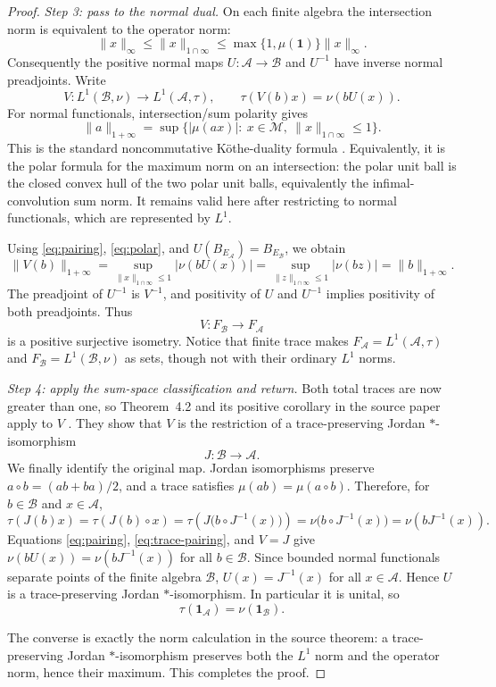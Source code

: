 \documentclass[11pt]{article}
\newcommand{\A}{\mathcal A}
\newcommand{\B}{\mathcal B}
\newcommand{\one}{\mathbf 1}
\newcommand{\Ncap}[1]{\lVert #1\rVert_{1\cap\infty}}
\begin{document}
\begin{proof}
\medskip
\noindent\emph{Step 3: pass to the normal dual.}
On each finite algebra the intersection norm is equivalent to the operator
norm:
\[
 \|x\|_\infty\leq\Ncap{x}\leq
 \max\{1,\mu(\one)\}\|x\|_\infty.
\]
Consequently the positive normal maps $U:\A\to\B$ and $U^{-1}$ have inverse
normal preadjoints.  Write
\begin{equation}\label{eq:pairing}
 V:L^1(\B,\nu)\longrightarrow L^1(\A,\tau),
 \qquad \tau(V(b)x)=\nu(bU(x)).
\end{equation}
For normal functionals, intersection/sum polarity gives
\begin{equation}\label{eq:polar}
 \|a\|_{1+\infty}
 =\sup\bigl\{|\mu(ax)|:\ x\in\mathcal M,
                   \ \|x\|_{1\cap\infty}\leq1\bigr\}.
\end{equation}
This is the standard noncommutative K\"othe-duality formula
\cite{DoddsDoddsDePagter}.  Equivalently, it is the polar formula for the
maximum norm on an intersection:
the polar unit ball is the closed convex hull of the two polar unit balls,
equivalently the infimal-convolution sum norm.  It remains valid here after
restricting to normal functionals, which are represented by $L^1$.

Using \eqref{eq:pairing}, \eqref{eq:polar}, and
$U(B_{E_\A})=B_{E_\B}$, we obtain
\[
 \|V(b)\|_{1+\infty}
 =\sup_{\Ncap{x}\leq1}|\nu(bU(x))|
 =\sup_{\Ncap{z}\leq1}|\nu(bz)|
 =\|b\|_{1+\infty}.
\]
The preadjoint of $U^{-1}$ is $V^{-1}$, and positivity of $U$ and $U^{-1}$
implies positivity of both preadjoints.  Thus
\[
 V:F_\B\longrightarrow F_\A
\]
is a positive surjective isometry.  Notice that finite trace makes
$F_\A=L^1(\A,\tau)$ and $F_\B=L^1(\B,\nu)$ as sets, though not with their
ordinary $L^1$ norms.

\medskip
\noindent\emph{Step 4: apply the sum-space classification and return.}
Both total traces are now greater than one, so Theorem~4.2 and its positive
corollary in the source paper apply to $V$
\cite[Theorem~4.2]{deJagerConradieExtreme}.  They show that $V$ is the
restriction of a trace-preserving Jordan $*$-isomorphism
\[
 J:\B\longrightarrow\A.
\]
We finally identify the original map.  Jordan isomorphisms preserve
$a\circ b=(ab+ba)/2$, and a trace satisfies
$\mu(ab)=\mu(a\circ b)$.  Therefore, for $b\in\B$ and $x\in\A$,
\begin{equation}\label{eq:trace-pairing}
 \tau(J(b)x)
 =\tau(J(b)\circ x)
 =\tau\!\left(J\bigl(b\circ J^{-1}(x)\bigr)\right)
 =\nu\bigl(b\circ J^{-1}(x)\bigr)
 =\nu(bJ^{-1}(x)).
\end{equation}
Equations \eqref{eq:pairing}, \eqref{eq:trace-pairing}, and $V=J$ give
\(\nu(bU(x))=\nu(bJ^{-1}(x))\) for all $b\in\B$.  Since bounded normal
functionals separate points of the finite algebra $\B$, $U(x)=J^{-1}(x)$ for
all $x\in\A$.  Hence $U$ is a trace-preserving Jordan $*$-isomorphism.
In particular it is unital, so
\[
 \tau(\one_\A)=\nu(\one_\B).
\]

The converse is exactly the norm calculation in the source theorem: a
trace-preserving Jordan $*$-isomorphism preserves both the $L^1$ norm and the
operator norm, hence their maximum.  This completes the proof.
\end{proof}
\end{document}
